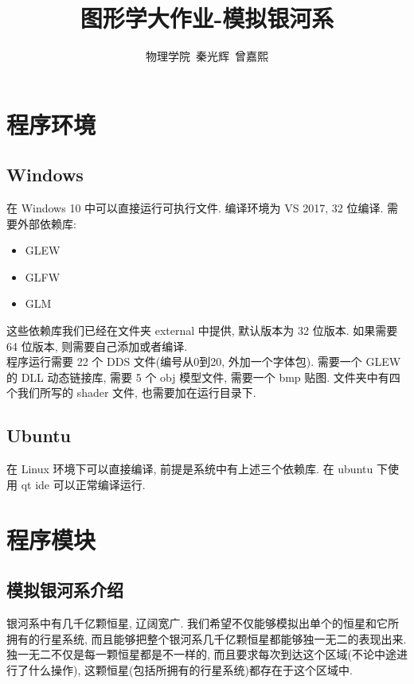 \documentclass[a4paper,12pt,titlepage]{article}
\begin{document}
\title{图形学大作业-模拟银河系}
\author{物理学院\ 秦光辉\ 曾嘉熙}
\maketitle

\tableofcontents
\newpage

\section{程序环境}

\subsection{Windows}

	在 Windows 10 中可以直接运行可执行文件. 编译环境为 VS 2017, 32 位编译. 需要外部依赖库:
	
\begin{itemize}
	\item GLEW
	\item GLFW
	\item GLM
\end{itemize}

	这些依赖库我们已经在文件夹 external 中提供, 默认版本为 32 位版本. 如果需要 64 位版本, 则需要自己添加或者编译. \\
	
	程序运行需要 22 个 DDS 文件(编号从0到20, 外加一个字体包). 需要一个 GLEW 的 DLL 动态链接库, 需要 5 个 obj 模型文件, 需要一个 bmp 贴图. 文件夹中有四个我们所写的 shader 文件, 也需要加在运行目录下.

\subsection{Ubuntu}

	在 Linux 环境下可以直接编译, 前提是系统中有上述三个依赖库. 在 ubuntu 下使用 qt ide 可以正常编译运行.

\section{程序模块}

\subsection{模拟银河系介绍}

	银河系中有几千亿颗恒星, 辽阔宽广. 我们希望不仅能够模拟出单个的恒星和它所拥有的行星系统, 而且能够把整个银河系几千亿颗恒星都能够独一无二的表现出来. 独一无二不仅是每一颗恒星都是不一样的, 而且要求每次到达这个区域(不论中途进行了什么操作), 这颗恒星(包括所拥有的行星系统)都存在于这个区域中. \\
	
\end{document}
